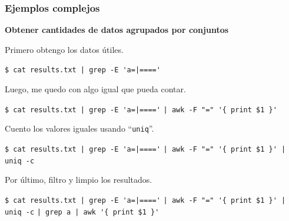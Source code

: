 \documentclass{beamer}
\begin{document}
\begin{frame}[fragile,t]
    \frametitle{\small Ejemplos complejos}
    \textbf{Obtener cantidades de datos agrupados por conjuntos}\\
    \begin{minipage}{0.75\textwidth}
    \vspace{0.6cm}
    \small \pause
    Primero obtengo los datos útiles.
    \vspace{-0.3cm} \scriptsize
    \begin{block}{\vspace*{-3ex}}
    \texttt{\$}\verb; cat results.txt | grep -E 'a=|====';
    \vspace*{0.5ex}
    \end{block}
    \vspace{0.4cm}
    \small \pause
    Luego, me quedo con algo igual que pueda contar.
    \vspace{-0.3cm} \scriptsize
    \begin{block}{\vspace*{-3ex}}
    \texttt{\$}\verb; cat results.txt | grep -E 'a=|====';
    \hspace*{2.48cm} \verb;| awk -F "=" '{ print $1 }';
    \vspace*{0.5ex}
    \end{block}
    \vspace{0.4cm}
    \small \pause
    Cuento los valores iguales usando ``\verb|uniq|''.
    \vspace{-0.3cm} \scriptsize
    \begin{block}{\vspace*{-3ex}}
    \texttt{\$}\verb; cat results.txt | grep -E 'a=|====';
    \hspace*{2.48cm} \verb;| awk -F "=" '{ print $1 }' | uniq -c;
    \vspace*{0.5ex}
    \end{block}
    \vspace{0.4cm}
    \small \pause
    Por último, filtro y limpio los resultados.
    \vspace{-0.3cm} \scriptsize
    \begin{block}{\vspace*{-3ex}}
    \texttt{\$}\verb; cat results.txt | grep -E 'a=|====';
    \hspace*{2.48cm} \verb;| awk -F "=" '{ print $1 }' | uniq -c;
    \hspace*{2.48cm} \verb;| grep a | awk '{ print $1 }';
    \vspace*{0.5ex}
    \end{block}

\end{minipage}
\end{frame}
\end{document}
